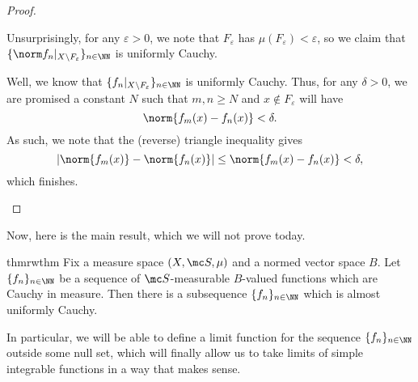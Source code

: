 \documentclass[../notes.tex]{subfiles}
\begin{document}
\begin{proof}
\begin{listalph}
		\item Unsurprisingly, for any $\varepsilon>0$, we note that $F_\varepsilon$ has $\mu(F_\varepsilon)<\varepsilon$, so we claim that $\{\norm f_n|_{X\setminus F_\varepsilon}\}_{n\in\NN}$ is uniformly Cauchy.

		Well, we know that $\{f_n|_{X\setminus F_\varepsilon}\}_{n\in\NN}$ is uniformly Cauchy. Thus, for any $\delta>0$, we are promised a constant $N$ such that $m,n\ge N$ and $x\notin F_\varepsilon$ will have
		\[\norm{f_m(x)-f_n(x)}<\delta.\]
		As such, we note that the (reverse) triangle inequality gives
		\[|\norm{f_m(x)}-\norm{f_n(x)}|\le\norm{f_m(x)-f_n(x)}<\delta,\]
		which finishes.
		\qedhere
	\end{listalph}
\end{proof}
Now, here is the main result, which we will not prove today.
\begin{restatable}{thm}{rwthm} \label{thm:rw}
	Fix a measure space $(X,\mc S,\mu)$ and a normed vector space $B$. Let $\{f_n\}_{n\in\NN}$ be a sequence of $\mc S$-measurable $B$-valued functions which are Cauchy in measure. Then there is a subsequence $\{f_n\}_{n\in\NN}$ which is almost uniformly Cauchy.
\end{restatable}
\noindent In particular, we will be able to define a limit function for the sequence $\{f_n\}_{n\in\NN}$ outside some null set, which will finally allow us to take limits of simple integrable functions in a way that makes sense.
\end{document}
